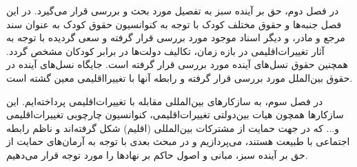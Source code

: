 \begin{enumerate}
	در فصل دوم، حق بر آینده سبز به تفصیل مورد بحث و بررسی قرار می‌گیرد. در این فصل جنبه‌ها و حقوق مختلف کودک با توجه به کنوانسیون حقوق کودک به عنوان سند مرجع و مادر، و دیگر اسناد موجود مورد بررسی قرار گرفته و سعی گردیده با توجه به آثار تغییرات‌اقلیمی در بازه زمان، تکالیف دولت‌ها در برابر کودکان مشخص گردد. همچنین حقوق نسل‌های آینده مورد بررسی قرار گرفته است. جایگاه نسل‌های آینده در حقوق بین‌الملل مورد بررسی قرار گرفته و رابطه آنها با تغییرا‌اقلیمی معین گشته است. 
	
	
	در فصل سوم، به  سازکار‌های بین‌المللی مقابله با تغییرات‌اقلیمی پرداخته‌ایم. این سازکار‌ها همچون هیات بین‌دولتی تغییرات‌اقلیمی، کنوانسیون چارچوبی تغییرات‌اقلیمی و... که در جهت حمایت از مشترکات بین‌المللی (اقلیم) شکل گرفته‌اند و ناظم رابطه اجتماعی با طبیعت هستند، می‌پردازیم و در مبحث بعدی با توجه به آرمان‌های حمایت از حق بر آینده سبز، مبانی و اصول حاکم بر نهاد‌ها را مورد توجه قرار می‌دهیم. 
	
	
\end{enumerate}


















































